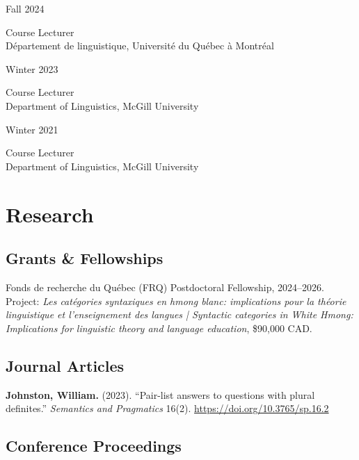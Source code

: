 \documentclass[11pt,oneside,DIV=calc,parskip=off]{scrarticle} %
\newlength{\leftcolwidth}
\newlength{\mycolspace}
\newlength{\rightcolwidth}
\newlength{\spacingbefore}
\newlength{\spacingafter}
\newcommand{\myonecol}[1]{%
	\vspace{\spacingbefore}%
	\begin{minipage}[t]{\linewidth}%
		\strut#1%
	\end{minipage}%
	\vspace{\spacingafter}\par%
	}
\newcommand{\mytwocol}[2]{%
	\vspace{\spacingbefore}%
	\begin{minipage}[t]{\leftcolwidth}%
		\strut#1%
	\end{minipage}%
	\hspace{\mycolspace}%
	\begin{minipage}[t]{\rightcolwidth}%
		\strut#2%
	\end{minipage}%
	\vspace{\spacingafter}\par%
	}
\newcommand{\pub}[1]{%
	\myonecol{#1}%
	}
\newcommand{\cvline}[2]{%
	\mytwocol{#1}{#2}%
	}
\begin{document}
\cvline{Fall 2024}{Course Lecturer\\Département de linguistique, Université du Québec à Montréal}

\cvline{Winter 2023}{Course Lecturer\\Department of Linguistics, McGill University}

\cvline{Winter 2021}{Course Lecturer\\Department of Linguistics, McGill University}


\section{Research}

\subsection{Grants \& Fellowships}

\pub{Fonds de recherche du Québec (FRQ) Postdoctoral Fellowship, 2024--2026. Project: \textit{Les catégories syntaxiques en hmong blanc: implications pour la théorie linguistique et l'enseignement des langues | Syntactic categories in White Hmong: Implications for linguistic theory and language education}, \$90,000 CAD.}

\subsection{Journal Articles}

\pub{\textbf{Johnston, William.} (2023). ``Pair-list answers to questions with plural definites.'' \textit{Semantics and Pragmatics} 16(2). \href{https://doi.org/10.3765/sp.16.2}{https://doi.org/10.3765/sp.16.2}}


\subsection{Conference Proceedings}
\end{document}
